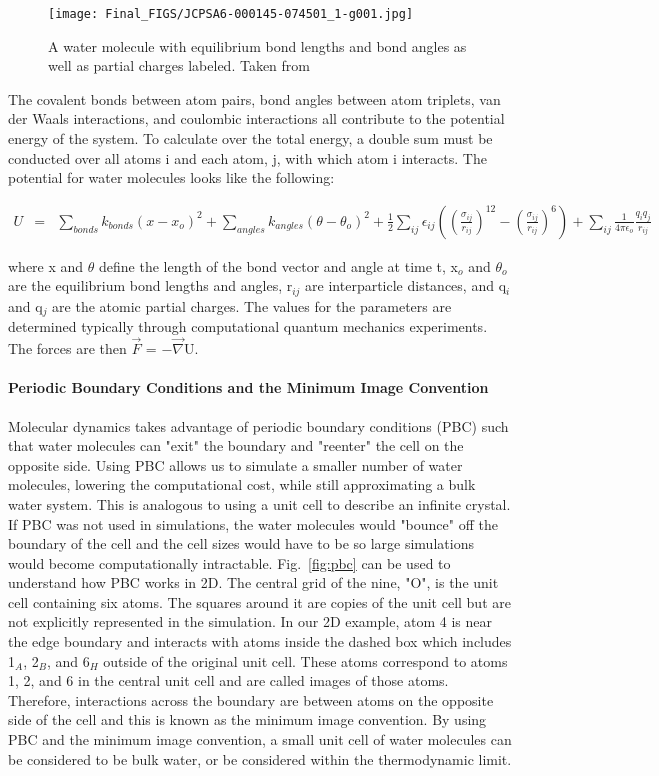 \documentclass{article}
\begin{document}
\begin{figure}
    \centering
    \texttt{[image: Final\_FIGS/JCPSA6-000145-074501\_1-g001.jpg]}
    \caption{A water molecule with equilibrium bond lengths and bond angles as well as partial charges labeled. Taken from ~\cite{Izadi_JCP_2016}}
    \label{fig:tip3p}
\end{figure}

The covalent bonds between atom pairs, bond angles between atom triplets, van der Waals interactions, and coulombic interactions all contribute to the potential energy of the system. To calculate over the total energy, a double sum must be conducted over all atoms i and each atom, j, with which atom i interacts. The potential for water molecules looks like the following:

\begin{eqnarray}
    U &=& \sum_{bonds} k_{bonds} (x-x_o)^2 + \sum_{angles} k_{angles} (\theta - \theta_o)^2 + \frac{1}{2} \sum_{ij} \epsilon_{ij} ((\frac{\sigma_{ij}}{r_{ij}})^{12} - (\frac{\sigma_{ij}}{r_{ij}})^{6}) + \sum_{ij} \frac{1}{4 \pi \epsilon_o} \frac{q_i q_j}{r_{ij}}
\end{eqnarray}

\noindent where x and $\theta$ define the length of the bond vector and angle at time t, x$_o$ and $\theta_o$ are the equilibrium bond lengths and angles, r$_{ij}$ are interparticle distances, and q$_i$ and q$_j$ are the atomic partial charges. The values for the parameters are determined typically through computational quantum mechanics experiments. The forces are then $\vec{F}$ = $-\vec{\nabla}$U.

\paragraph{Periodic Boundary Conditions and the Minimum Image Convention} Molecular dynamics takes advantage of periodic boundary conditions (PBC) such that water molecules can "exit" the boundary and "reenter" the cell on the opposite side. Using PBC allows us to simulate a smaller number of water molecules, lowering the computational cost, while still approximating a bulk water system. This is analogous to using a unit cell to describe an infinite crystal. If PBC was not used in simulations, the water molecules would "bounce" off the boundary of the cell and the cell sizes would have to be so large simulations would become computationally intractable. Fig.~\ref{fig:pbc} can be used to understand how PBC works in 2D. The central grid of the nine, "O", is the unit cell containing six atoms. The squares around it are copies of the unit cell but are not explicitly represented in the simulation. In our 2D example, atom 4 is near the edge boundary and interacts with atoms inside the dashed box which includes 1$_A$, 2$_B$, and 6$_H$ outside of the original unit cell. These atoms correspond to atoms 1, 2, and 6 in the central unit cell and are called images of those atoms. Therefore, interactions across the boundary are between atoms on the opposite side of the cell and this is known as the minimum image convention. By using PBC and the minimum image convention, a small unit cell of water molecules can be considered to be bulk water, or be considered within the thermodynamic limit.
\end{document}
